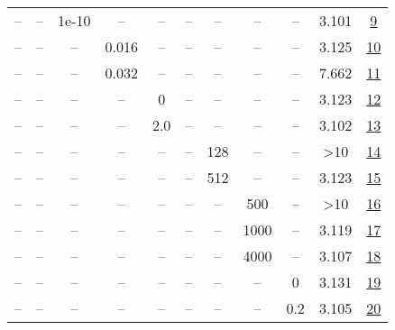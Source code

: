 \begin{table}[H]
\begin{tabular}{ccccccccccc}
-- & -- & 1e-10 & -- & -- & -- & -- & -- & -- & 3.101 & \href{https://wandb.ai/stanford-mercury/optimizer-scaling/runs/sweep-520m-10B-cautiouse8c98clr0.008-wd0.1-minlr0-warmup2000-b10-205bf1}{9} \\
-- & -- & -- & 0.016 & -- & -- & -- & -- & -- & 3.125 & \href{https://wandb.ai/stanford-mercury/optimizer-scaling/runs/sweep-520m-10B-cautiouse471f6lr0.016-wd0.1-minlr0-warmup2000-b10-bfc30c}{10} \\
-- & -- & -- & 0.032 & -- & -- & -- & -- & -- & 7.662 & \href{https://wandb.ai/stanford-mercury/optimizer-scaling/runs/sweep-520m-10B-cautious78e82clr0.032-wd0.1-minlr0-warmup2000-b10-5beb17}{11} \\
-- & -- & -- & -- & 0 & -- & -- & -- & -- & 3.123 & \href{https://wandb.ai/stanford-mercury/optimizer-scaling/runs/sweep-520m-10B-cautious5d8caalr0.008-wd0.1-minlr0-warmup2000-b10-4373b6}{12} \\
-- & -- & -- & -- & 2.0 & -- & -- & -- & -- & 3.102 & \href{https://wandb.ai/stanford-mercury/optimizer-scaling/runs/sweep-520m-10B-cautiousc4ab60lr0.008-wd0.1-minlr0-warmup2000-b10-76b50c}{13} \\
-- & -- & -- & -- & -- & -- & 128 & -- & -- & >10 & \href{https://wandb.ai/stanford-mercury/optimizer-scaling/runs/sweep-520m-10B-cautious7aa1c5lr0.008-wd0.1-minlr0-warmup2000-b10-04d11d}{14} \\
-- & -- & -- & -- & -- & -- & 512 & -- & -- & 3.123 & \href{https://wandb.ai/stanford-mercury/optimizer-scaling/runs/sweep-520m-10B-cautious51724blr0.008-wd0.1-minlr0-warmup2000-b10-9e973d}{15} \\
-- & -- & -- & -- & -- & -- & -- & 500 & -- & >10 & \href{https://wandb.ai/stanford-mercury/optimizer-scaling/runs/sweep-520m-10B-cautiousea3733lr0.008-wd0.1-minlr0-warmup500-b10.-52a99f}{16} \\
-- & -- & -- & -- & -- & -- & -- & 1000 & -- & 3.119 & \href{https://wandb.ai/stanford-mercury/optimizer-scaling/runs/sweep-520m-10B-cautious383408lr0.008-wd0.1-minlr0-warmup1000-b10-4b5602}{17} \\
-- & -- & -- & -- & -- & -- & -- & 4000 & -- & 3.107 & \href{https://wandb.ai/stanford-mercury/optimizer-scaling/runs/sweep-520m-10B-cautious2cb775lr0.008-wd0.1-minlr0-warmup4000-b10-0fed88}{18} \\
-- & -- & -- & -- & -- & -- & -- & -- & 0 & 3.131 & \href{https://wandb.ai/stanford-mercury/optimizer-scaling/runs/sweep-520m-10B-cautious589f93lr0.008-wd0-minlr0-warmup2000-b10.9-10ee8d}{19} \\
-- & -- & -- & -- & -- & -- & -- & -- & 0.2 & 3.105 & \href{https://wandb.ai/stanford-mercury/optimizer-scaling/runs/sweep-520m-10B-cautious413a92lr0.008-wd0.2-minlr0-warmup2000-b10-75bee0}{20} \\
\bottomrule
\end{tabular}
\end{table}

